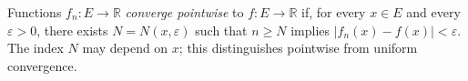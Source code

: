 
Functions $f_n:E\to\mathbb R$ \emph{converge pointwise} to $f:E\to\mathbb R$ if, for every $x\in E$ and every $\varepsilon>0$, there exists $N=N(x,\varepsilon)$ such that $n\ge N$ implies $|f_n(x)-f(x)|<\varepsilon$. The index $N$ may depend on $x$; this distinguishes pointwise from uniform convergence.
